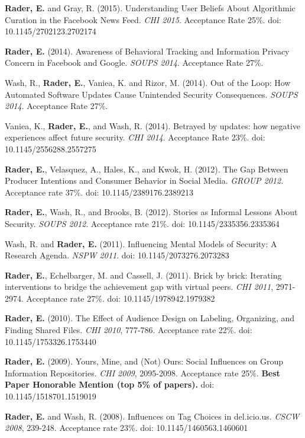 \documentclass[9pt]{extarticle}
\begin{document}
\textbf{Rader, E.} and Gray, R. (2015). Understanding User Beliefs About Algorithmic Curation in the Facebook News Feed. \emph{CHI 2015}. Acceptance Rate 25\%. doi: 10.1145/2702123.2702174

\textbf{Rader, E.} (2014). Awareness of Behavioral Tracking and Information Privacy Concern in Facebook and Google. \emph{SOUPS 2014}. Acceptance Rate 27\%.

Wash, R., \textbf{Rader, E.}, Vaniea, K. and Rizor, M. (2014). Out of the Loop: How Automated Software Updates Cause Unintended Security Consequences. \emph{SOUPS 2014}. Acceptance Rate 27\%.

Vaniea, K., \textbf{Rader, E.}, and Wash, R. (2014). Betrayed by updates: how negative experiences affect future security. \emph{CHI 2014}. Acceptance Rate 23\%. doi: 10.1145/2556288.2557275

\textbf{Rader, E.}, Velasquez, A., Hales, K., and Kwok, H. (2012). The Gap Between Producer Intentions and Consumer Behavior in Social Media. \emph{GROUP 2012}. Acceptance rate 37\%. doi: 10.1145/2389176.2389213

\textbf{Rader, E.}, Wash, R., and Brooks, B. (2012). Stories as Informal Lessons About Security. \emph{SOUPS 2012}. Acceptance rate 21\%. doi: 10.1145/2335356.2335364

Wash, R. and \textbf{Rader, E.} (2011). Influencing Mental Models of Security: A Research Agenda. \emph{NSPW 2011}. doi: 10.1145/2073276.2073283

\textbf{Rader, E.}, Echelbarger, M. and Cassell, J. (2011). Brick by brick: Iterating interventions to bridge the achievement gap with virtual peers. \emph{CHI 2011}, 2971-2974. Acceptance rate 27\%. doi: 10.1145/1978942.1979382

\textbf{Rader, E.} (2010). The Effect of Audience Design on Labeling, Organizing, and Finding Shared Files. \emph{CHI 2010}, 777-786. Acceptance rate 22\%. doi: 10.1145/1753326.1753440

\textbf{Rader, E.} (2009). Yours, Mine, and (Not) Ours: Social Influences on Group Information Repositories. \emph{CHI 2009}, 2095-2098. Acceptance rate 25\%. \textbf{Best Paper Honorable Mention (top 5\% of papers).} doi: 10.1145/1518701.1519019

\textbf{Rader, E.} and Wash, R. (2008). Influences on Tag Choices in del.icio.us. \emph{CSCW 2008}, 239-248. Acceptance rate 23\%. doi: 10.1145/1460563.1460601
\end{document}
